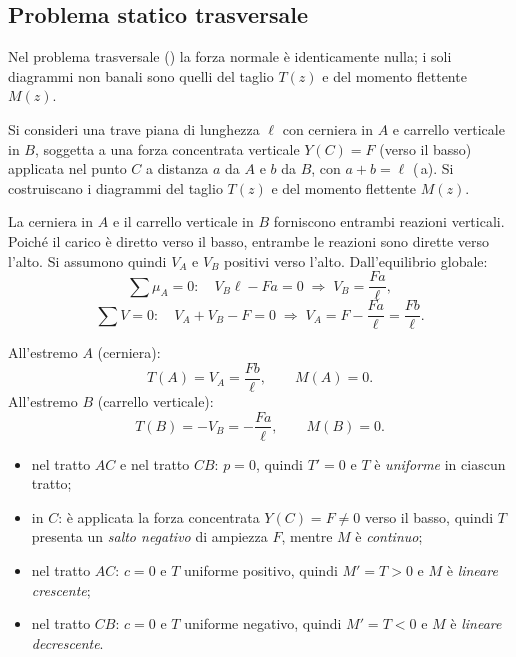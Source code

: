 \subsection{Problema statico trasversale}
\label{sec:esempi_trasversale}

Nel problema trasversale ()
la forza normale è identicamente nulla; i soli
diagrammi non banali sono quelli del taglio $T(z)$
e del momento flettente $M(z)$.


\begin{esempio}
	Si consideri una trave piana di lunghezza $\ell$
	con cerniera in $A$ e carrello verticale in $B$,
	soggetta a una forza concentrata verticale
	$Y(C) = F$ (verso il basso) applicata nel punto
	$C$ a distanza $a$ da $A$ e $b$ da $B$, con
	$a + b = \ell$ (\,a).
	Si costruiscano i diagrammi del taglio $T(z)$
	e del momento flettente $M(z)$.
	
	\begin{svolgimento}
		



		
		
		La cerniera in $A$ e il carrello verticale in $B$
		forniscono entrambi reazioni verticali.
		Poiché il carico è diretto verso il basso,
		entrambe le reazioni sono dirette verso l'alto.
		Si assumono quindi $V_A$ e $V_B$ positivi
		verso l'alto.
		Dall'equilibrio globale:
		\[
		\sum \mu_A = 0:\quad
		V_B\ell - F a = 0
		\;\Rightarrow\;
		V_B = \frac{Fa}{\ell},
		\]
		\[
		\sum V = 0:\quad
		V_A + V_B - F = 0
		\;\Rightarrow\;
		V_A = F - \frac{Fa}{\ell} = \frac{Fb}{\ell}.
		\]
		
		All'estremo $A$ (cerniera):
		\[
		T(A) = V_A = \frac{Fb}{\ell}, \qquad M(A) = 0.
		\]
		All'estremo $B$ (carrello verticale):
		\[
		T(B) = -V_B = -\frac{Fa}{\ell}, \qquad M(B) = 0.
		\]
		
		\begin{itemize}[nosep]
			\item nel tratto $AC$ e nel tratto $CB$:
			$p = 0$, quindi $T' = 0$ e $T$ è
			\emph{uniforme} in ciascun tratto;
			\item in $C$: è applicata la forza concentrata
			$Y(C) = F \neq 0$ verso il basso,
			quindi $T$ presenta un \emph{salto
				negativo} di ampiezza $F$, mentre
			$M$ è \emph{continuo};
			\item nel tratto $AC$: $c = 0$ e $T$
			uniforme positivo, quindi $M' = T > 0$
			e $M$ è \emph{lineare crescente};
			\item nel tratto $CB$: $c = 0$ e $T$
			uniforme negativo, quindi $M' = T < 0$
			e $M$ è \emph{lineare decrescente}.
		\end{itemize}
		

\end{svolgimento}
\end{esempio}
